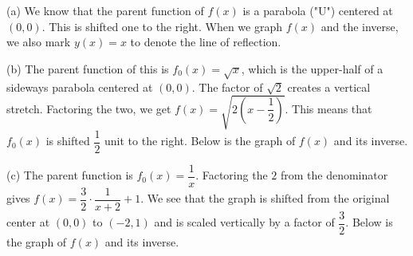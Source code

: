 \documentclass[lang=en,11pt]{elegantbook}
\begin{document}
(a) We know that the parent function of $f(x)$ is a parabola ("U") centered at $(0,0)$.  This is shifted one to the right.  When we graph $f(x)$ and the inverse, we also mark $y(x)=x$ to denote the line of reflection.
\begin{figure}[!ht]
    \centering
\end{figure}

(b) The parent function of this is $f_0(x)=\sqrt{x}$, which is the upper-half of a sideways parabola centered at $(0,0)$.  The factor of $\sqrt{2}$ creates a vertical stretch.  Factoring the two, we get $f(x)=\sqrt{2\left(x-\dfrac{1}{2}\right)}$.  This means that $f_0(x)$ is shifted $\dfrac{1}{2}$ unit to the right.  Below is the graph of $f(x)$ and its inverse.

\begin{figure}[!ht]
    \centering
\end{figure}

(c) The parent function is $f_0(x)=\dfrac{1}{x}$.  Factoring the $2$ from the denominator gives $f(x)=\dfrac{3}{2}\cdot \dfrac{1}{x+2}+1$. We see that the graph is shifted from the original center at $(0,0)$ to $(-2,1)$ and is scaled vertically by a factor of $\dfrac{3}{2}$.  Below is the graph of $f(x)$ and its inverse.
\end{document}
